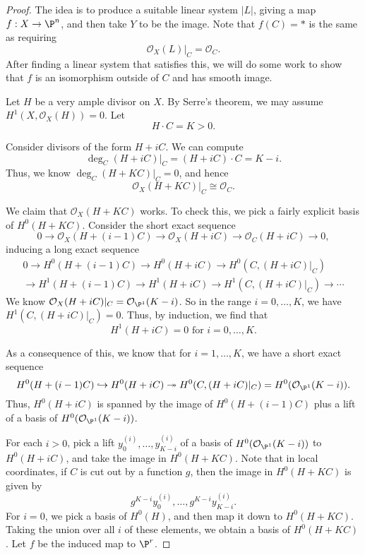 \documentclass[a4paper]{article}
\begin{document}
\begin{proof}
  The idea is to produce a suitable linear system $|L|$, giving a map $f: X \to \P^n$, and then take $Y$ to be the image. Note that $f(C) = *$ is the same as requiring
  \[
    \mathcal{O}_X(L)|_C = \mathcal{O}_C.
  \]
  After finding a linear system that satisfies this, we will do some work to show that $f$ is an isomorphism outside of $C$ and has smooth image.

  Let $H$ be a very ample divisor on $X$. By Serre's theorem, we may assume $H^1(X, \mathcal{O}_X(H)) = 0$. Let
  \[
    H \cdot C = K > 0.
  \]

  Consider divisors of the form $H + iC$. We can compute
  \[
    \deg_C (H + iC)|_C = (H + iC) \cdot C = K - i.
  \]
  Thus, we know $\deg_C (H + KC)|_C = 0$, and hence
  \[
    \mathcal{O}_X(H + KC)|_C \cong \mathcal{O}_C.
  \]

  We claim that $\mathcal{O}_X(H + KC)$ works. To check this, we pick a fairly explicit basis of $H^0(H + KC)$. Consider the short exact sequence
  \[
    0 \to \mathcal{O}_X (H + (i - 1) C) \to \mathcal{O}_X(H + iC) \to \mathcal{O}_C(H + iC) \to 0,
  \]
  inducing a long exact sequence
  \begin{multline*}
    0 \to H^0(H + (i - 1)C) \to H^0(H + iC) \to H^0(C, (H + iC)|_C)\\
    \to H^1(H + (i - 1)C) \to H^1(H + iC) \to H^1(C, (H + iC)|_C) \to \cdots
  \end{multline*}
  We know $\mathcal{O}_X(H + iC)|_C = \mathcal{O}_{\P^1}(K - i)$. So in the range $i = 0, \ldots, K$, we have $H^1(C, (H + iC)|_C) = 0$. Thus, by induction, we find that
  \[
    H^1(H + iC) = 0\text{ for }i = 0, \ldots, K.
  \]

  As a consequence of this, we know that for $i = 1, \ldots, K$, we have a short exact sequence
  \[
    H^0(H + (i - 1)C) \hookrightarrow H^0(H + iC) \twoheadrightarrow H^0(C, (H + iC)|_C) = H^0(\mathcal{O}_{\P^1}(K - i)).
  \]
  Thus, $H^0(H + iC)$ is spanned by the image of $H^0(H + (i - 1)C)$ plus a lift of a basis of $H^0(\mathcal{O}_{\P^1}(K - i))$.

  For each $i > 0$, pick a lift $y^{(i)}_0, \ldots, y^{(i)}_{K - i}$ of a basis of $H^0(\mathcal{O}_{\P^1}(K - i))$ to $H^0(H + iC)$, and take the image in $H^0(H + KC)$. Note that in local coordinates, if $C$ is cut out by a function $g$, then the image in $H^0(H + KC)$ is given by
  \[
    g^{K - i}y^{(i)}_0, \ldots, g^{K - i}y^{(i)}_{K - i}.
  \]
  For $i = 0$, we pick a basis of $H^0(H)$, and then map it down to $H^0(H + KC)$. Taking the union over all $i$ of these elements, we obtain a basis of $H^0(H + KC)$. Let $f$ be the induced map to $\P^r$.


\end{proof}
\end{document}
